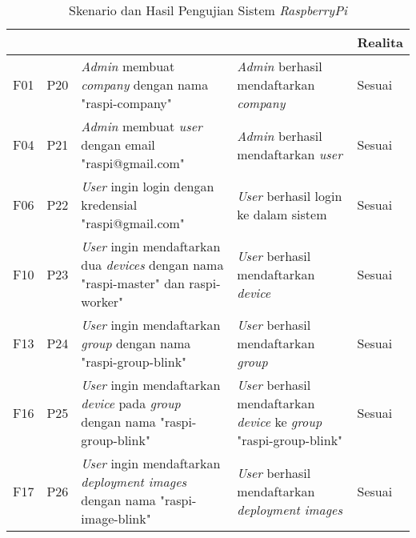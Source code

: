 \bgroup
\begin{table}[ht]
  \def\arraystretch{1.3}
  \caption{Skenario dan Hasil Pengujian Sistem \textit{RaspberryPi}}
  \label{tab:pengujian-sistem-raspi}
  \centering
  \begin{tabular}{|p{2cm}|p{2cm}|p{3cm}|p{3cm}|p{1.5cm}|}
    \hline
    \centering{ID Fungsional} & \centering{ID Pengujian}                            & \centering{Skenario}                                                                                 & \centering{Ekspektasi}                                                                    & Realita \\
    \hline
    F01                       & P20                                                 & \textit{Admin} membuat \textit{company} dengan nama "raspi-company"                                  & \textit{Admin} berhasil mendaftarkan \textit{company}                                     & Sesuai  \\
    \hline
    F04                       & P21                                                 & \textit{Admin} membuat \textit{user} dengan email "raspi@gmail.com"                                  & \textit{Admin} berhasil mendaftarkan \textit{user}                                        & Sesuai  \\
    \hline
    F06                       & P22                                                 & \textit{User} ingin login dengan kredensial "raspi@gmail.com"                                        & \textit{User} berhasil login ke dalam sistem                                              & Sesuai  \\
    \hline
    F10                       & P23                                                 & \textit{User} ingin mendaftarkan dua \textit{devices} dengan nama "raspi-master" dan
    raspi-worker"             & \textit{User} berhasil mendaftarkan \textit{device} & Sesuai                                                                                                                                                                                                     \\
    \hline
    F13                       & P24                                                 & \textit{User} ingin mendaftarkan \textit{group} dengan nama "raspi-group-blink"                      & \textit{User} berhasil mendaftarkan \textit{group}                                        & Sesuai  \\
    \hline
    F16                       & P25                                                 & \textit{User} ingin mendaftarkan \textit{device} pada \textit{group} dengan nama "raspi-group-blink" & \textit{User} berhasil mendaftarkan \textit{device} ke \textit{group} "raspi-group-blink" & Sesuai  \\
    \hline
    F17                       & P26                                                 & \textit{User} ingin mendaftarkan \textit{deployment images} dengan nama "raspi-image-blink"          & \textit{User} berhasil mendaftarkan \textit{deployment images}                            & Sesuai  \\
    \hline
  \end{tabular}
\end{table}
\egroup

